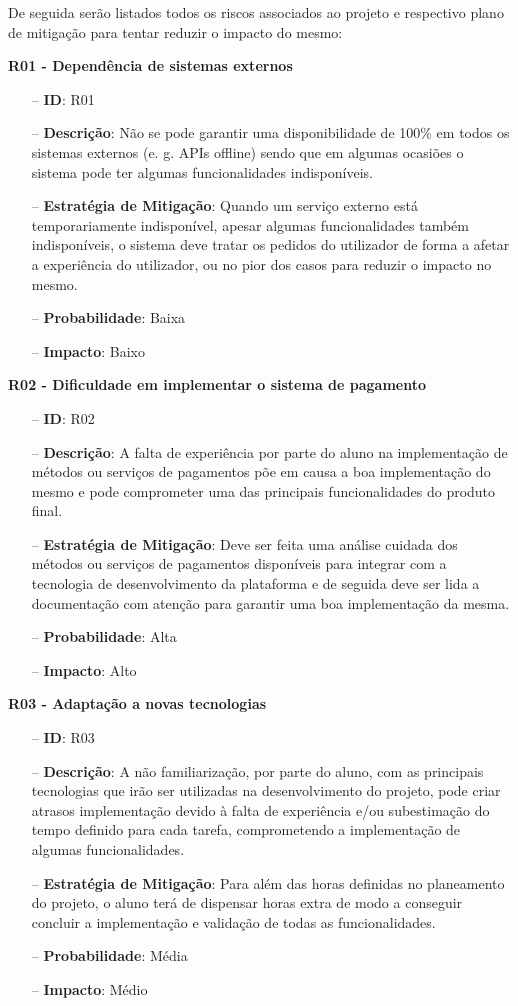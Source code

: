 De seguida serão listados todos os riscos associados ao projeto e respectivo plano de mitigação para tentar reduzir o impacto do mesmo:

\textbf{R01 - Dependência de sistemas externos}
\begin{itemize}
	\item[--] \textbf{ID}: R01
	\item[--] \textbf{Descrição}: Não se pode garantir uma disponibilidade de 100\% em todos os sistemas externos (e. g. APIs offline) sendo que em algumas ocasiões o sistema pode ter algumas funcionalidades indisponíveis.
	\item[--] \textbf{Estratégia de Mitigação}: Quando um serviço externo está temporariamente indisponível, apesar algumas funcionalidades também indisponíveis, o sistema deve tratar os pedidos do utilizador de forma a afetar a experiência do utilizador, ou no pior dos casos para reduzir o impacto no mesmo.
	\item[--] \textbf{Probabilidade}: Baixa
	\item[--] \textbf{Impacto}: Baixo
\end{itemize}

\textbf{R02 - Dificuldade em implementar o sistema de pagamento}
\begin{itemize}
	\item[--] \textbf{ID}: R02
	\item[--] \textbf{Descrição}: A falta de experiência por parte do aluno na implementação de métodos ou serviços de pagamentos põe em causa a boa implementação do mesmo e pode comprometer uma das principais funcionalidades do produto final.
	\item[--] \textbf{Estratégia de Mitigação}: Deve ser feita uma análise cuidada dos métodos ou serviços de pagamentos disponíveis para integrar com a tecnologia de desenvolvimento da plataforma e de seguida deve ser lida a documentação com atenção para garantir uma boa implementação da mesma.
	\item[--] \textbf{Probabilidade}: Alta
	\item[--] \textbf{Impacto}: Alto
\end{itemize}

\textbf{R03 - Adaptação a novas tecnologias }
\begin{itemize}
	\item[--] \textbf{ID}: R03
	\item[--] \textbf{Descrição}: A não familiarização, por parte do aluno, com as principais tecnologias que irão ser utilizadas na desenvolvimento do projeto, pode criar atrasos implementação devido à falta de experiência e/ou subestimação do tempo definido para cada tarefa, comprometendo a implementação de algumas funcionalidades.
	\item[--] \textbf{Estratégia de Mitigação}: Para além das horas definidas no planeamento do projeto, o aluno terá de dispensar horas extra de modo a conseguir concluir a implementação e validação de todas as funcionalidades.
	\item[--] \textbf{Probabilidade}: Média
	\item[--] \textbf{Impacto}: Médio
\end{itemize}

